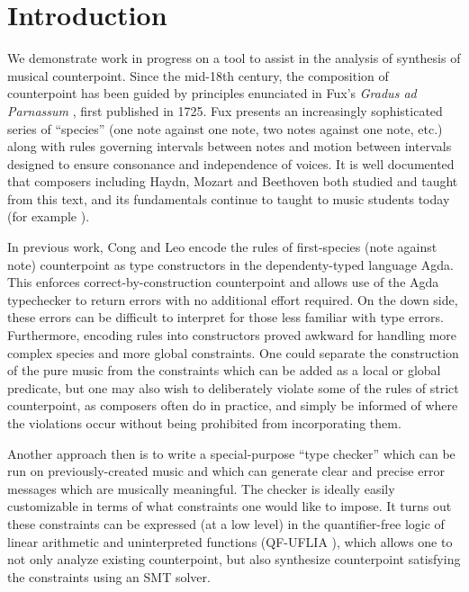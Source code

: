 \documentclass[sigplan,screen]{acmart}
\begin{document}
\section{Introduction}

We demonstrate work in progress on a tool to assist in the analysis of
synthesis of musical counterpoint. Since the mid-18th century, the
composition of counterpoint has been guided by principles enunciated
in Fux's \textit{Gradus ad Parnassum} \citep{Fux1965}, first published
in 1725. Fux presents an increasingly sophisticated series of
``species'' (one note against one note, two notes against one note,
etc.) along with rules governing intervals between notes and motion
between intervals designed to ensure consonance and independence of
voices. It is well documented \citep{Mann1987} that composers
including Haydn, Mozart and Beethoven both studied and taught from
this text, and its fundamentals continue to taught to music students
today (for example \cite{Kennan1999, Aldwell2018}).

In previous work, Cong and Leo \citep{CongLeo2019} encode the rules of
first-species (note against note) counterpoint as type constructors in
the dependenty-typed language Agda. This enforces
correct-by-construction counterpoint and allows use of the Agda
typechecker to return errors with no additional effort required. On
the down side, these errors can be difficult to interpret for those
less familiar with type errors. Furthermore, encoding rules into
constructors proved awkward for handling more complex species and
more global constraints. One could separate the construction of the
pure music from the constraints which can be added as a local or
global predicate, but one may also wish to deliberately violate some
of the rules of strict counterpoint, as composers often do in
practice, and simply be informed of where the violations occur without
being prohibited from incorporating them.

Another approach then is to write a special-purpose ``type checker''
which can be run on previously-created music and which can generate
clear and precise error messages which are musically meaningful. The
checker is ideally easily customizable in terms of what constraints
one would like to impose. It turns out these constraints can be
expressed (at a low level) in the quantifier-free logic of linear
arithmetic and uninterpreted functions (QF-UFLIA \cite{Barrett2010}),
which allows one to not only analyze existing counterpoint, but also
synthesize counterpoint satisfying the constraints using an SMT
solver.
\end{document}
